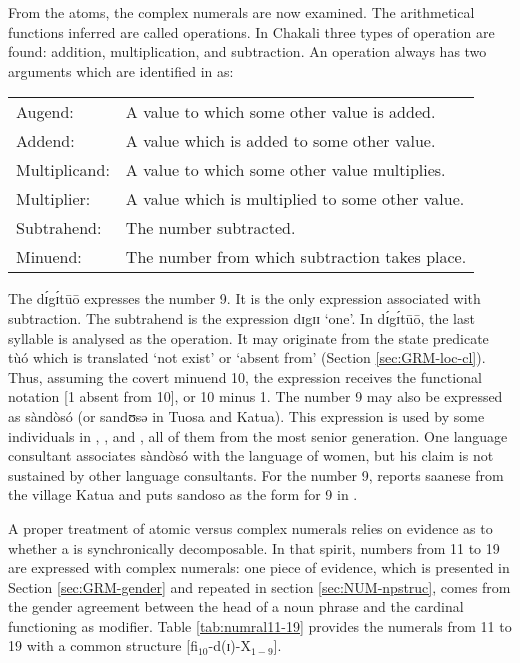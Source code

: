 \begin{exe}
\begin{exe}
\begin{exe}
\begin{exe}
\begin{exe}
\begin{exe}
\begin{exe}
\begin{exe}
\begin{exe}
\begin{exe}
From the atoms,  the complex numerals are now examined. The arithmetical functions inferred are called operations. In Chakali three types of operation are found: addition, multiplication, and subtraction. An operation always has two arguments which are identified in \citet{Gree78b} as: 

\vspace{2ex}

\begin{tabular}{ll}
{ Augend:} & A value to which some other value is
added.\\
{ Addend:} & A value which is added to some other
value.\\
{ Multiplicand:} & A value to which some other
value multiplies.\\

{ Multiplier:} & A value which is multiplied to
some other value.\\

{ Subtrahend:}  & The number subtracted.\\
{ Minuend:}  & The number from which subtraction takes
place.\\
\end{tabular}

\vspace{2ex}

The  {\sls   dɪ́gɪ́tūō} expresses the number 9. It is the only expression associated with subtraction.  The subtrahend is the expression {\sls dɪgɪɪ} `one'.   In {\sls   dɪ́gɪ́tūō},  the last syllable   is analysed as the operation. It may originate from the state predicate  {\sls tùó} which is translated `not exist'  or `absent from' (Section \ref{sec:GRM-loc-cl}). Thus, assuming the covert minuend 10, the  expression receives the functional notation [1 {\sc absent from} 10], or 10 minus 1.  The number 9 may also be expressed as {\sls sàndòsó}  (or {\sls sandʊsə} in Tuosa and Katua). This expression is used by some individuals in , , and , all of them from the most senior generation.  One language consultant associates  {\sls sàndòsó} with the language of women, but his claim is not sustained by other language consultants. For the number 9, \citet[33]{Good54} reports {\sls saanese} from the village Katua and  \citet[117]{Ratt32b} puts {\sls sandoso} as the form for 9 in . 

A proper  treatment of  atomic versus  complex numerals   relies  on evidence as to whether a  is synchronically  decomposable. In  that spirit,  numbers from 11 to 19 are expressed with complex numerals:  one piece of evidence, which is presented in Section \ref{sec:GRM-gender} and repeated in section \ref{sec:NUM-npstruc}, comes from the gender agreement between the head of a noun phrase and the cardinal  functioning as modifier.  Table \ref{tab:numral11-19} provides the  numerals from 11 to 19 with a common structure [fi$_{10}$-d(ɪ)-X$_{1-9}$]. 



\end{exe}
\end{exe}
\end{exe}
\end{exe}
\end{exe}
\end{exe}
\end{exe}
\end{exe}
\end{exe}
\end{exe}
